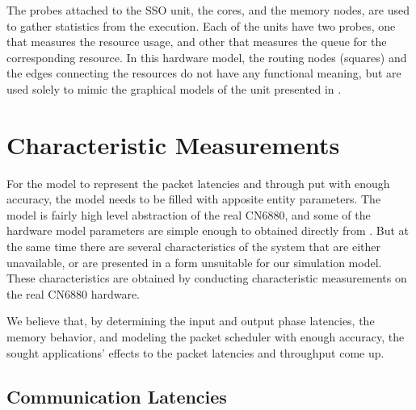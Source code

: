 The probes attached to the SSO unit, the cores, and the memory nodes, are used to gather statistics from the execution. Each of the units have two probes, one that measures the resource usage, and other that measures the queue for the corresponding resource. In this hardware model, the routing nodes (squares) and the edges connecting the resources do not have any functional meaning, but are used solely to mimic the graphical models of the unit presented in \cite{Cavium FUNDAMENTAL}.

\section{Characteristic Measurements}
\label{sec:characteristic-measurements}

For the model to represent the packet latencies and through put with enough accuracy, the model needs to be filled with apposite entity parameters. The model is fairly high level abstraction of the real CN6880, and some of the hardware model parameters are simple enough to obtained directly from \cite{Cavium FUNDAMENTAL}. But at the same time there are several characteristics of the system that are either unavailable, or are presented in a form unsuitable for our simulation model. These characteristics are obtained by conducting characteristic measurements on the real CN6880 hardware.

We believe that, by determining the input and output phase latencies, the memory behavior, and modeling the packet scheduler with enough accuracy, the sought applications' effects to the packet latencies and throughput come up.




\subsection{Communication Latencies}

